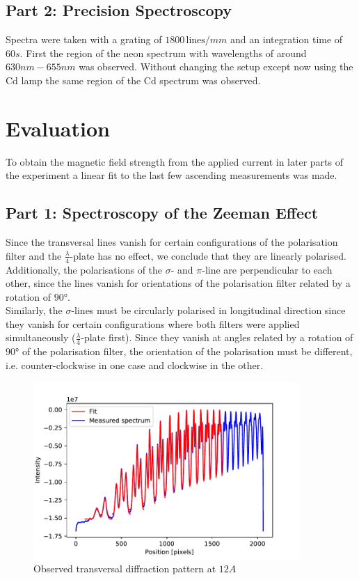 \documentclass[12pt]{article}
\begin{document}
\subsection{Part 2: Precision Spectroscopy}
Spectra were taken with a grating of $1800\, \text{lines}/mm$ and an integration time of $60 s$. First the region of the neon spectrum with wavelengths of around $630nm-655nm$ was observed. Without changing the setup except now using the Cd lamp the same region of the Cd spectrum was observed. 
\section{Evaluation}
	To obtain the magnetic field strength from the applied current in later parts of the experiment a linear fit to the last few ascending measurements was made. 
\subsection{Part 1: Spectroscopy of the Zeeman Effect}
	Since the transversal lines vanish for certain configurations of the polarisation filter and the $\frac{\lambda}{4}$-plate has no effect, we conclude that they are linearly polarised. Additionally, the polarisations of the $\sigma$- and $\pi$-line are perpendicular to each other, since the lines vanish for orientations of the polarisation filter related by a rotation of $\ang{90}$.\\
	Similarly, the $\sigma$-lines must be circularly polarised in longitudinal direction since they vanish for certain configurations where both filters were applied simultaneously ($\frac{\lambda}{4}$-plate first). Since they vanish at angles related by a rotation of $\ang{90}$ of the polarisation filter, the orientation of the polarisation must be different, i.e. counter-clockwise in one case and clockwise in the other.\\
\begin{figure}
\centering
\label{fig:master12_A}
\includegraphics[width=0.9\textwidth]{fig/master12A.pdf}
\caption{Observed transversal diffraction pattern at $12A$}
\end{figure}
\end{document}
